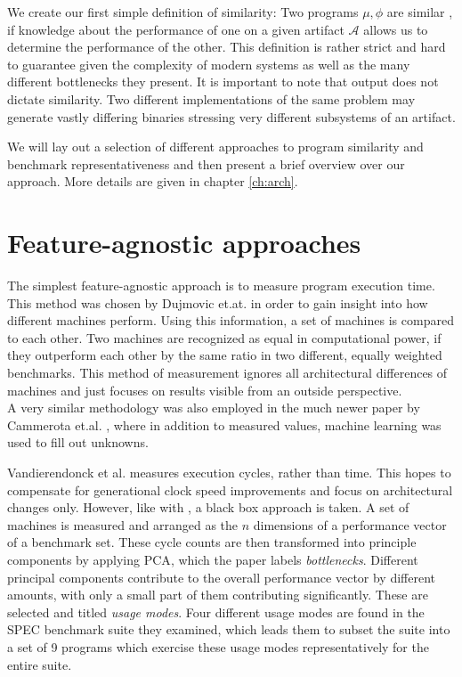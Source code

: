 \documentclass[../bachelor_paper.tex]{subfiles}
\begin{document}
We create our first simple definition of similarity: Two programs $\mu, \phi$ are similar , if knowledge about the performance of one on a given artifact $\mathcal{A}$ allows us to determine the performance of the other. This definition is rather strict and hard to guarantee given the complexity of modern systems as well as the many different bottlenecks they present. It is important to note that output does not dictate similarity. Two different implementations of the same problem may generate vastly differing binaries stressing very different subsystems of an artifact.

We will lay out a selection of different approaches to program similarity and benchmark representativeness and then present a brief overview over our approach. More details are given in chapter \ref{ch:arch}.

\section{Feature-agnostic approaches}
	\label{sec:prob/agno}
The simplest feature-agnostic approach is to measure program execution time. This method was chosen by Dujmovic et.at. \cite{dujmovicEvolutionEvaluationSPEC1998} in order to gain insight into how different machines perform. Using this information, a set of machines is compared to each other. Two machines are recognized as equal in computational power, if they outperform each other by the same ratio in two different, equally weighted benchmarks. This method of measurement ignores all architectural differences of machines and just focuses on results visible from an outside perspective.\\
A very similar methodology was also employed in the much newer paper by Cammerota et.al. \cite{cammarotaOptimizingProgramPerformance2013}, where in addition to measured values, machine learning was used to fill out unknowns.

Vandierendonck et al. \cite{vandierendonckManyBenchmarksStress} measures execution cycles, rather than time. This hopes to compensate for generational clock speed improvements and focus on architectural changes only. However, like with \cite{dujmovicEvolutionEvaluationSPEC1998}, a black box approach is taken. A set of machines is measured and arranged as the $n$ dimensions of a performance vector of a benchmark set. These cycle counts are then transformed into principle components by applying \ac{PCA}, which the paper labels \emph{bottlenecks}. Different principal components contribute to the overall performance vector by different amounts, with only a small part of them contributing significantly. These are selected and titled \emph{usage modes}. Four different usage modes are found in the \ac{SPEC} benchmark suite they examined, which leads them to subset the suite into a set of 9 programs which exercise these usage modes representatively for the entire suite.
\end{document}
